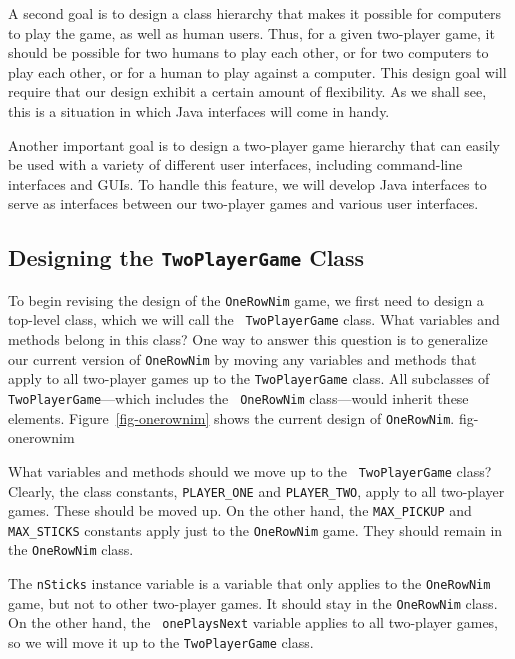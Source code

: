 A second goal is to design a class hierarchy that makes it possible
for computers to play the game, as well as human users. Thus, for a
given two-player game, it should be possible for two humans to play
each other, or for two computers to play each other, or for a human
to play against a computer.  This design goal will require that our
design exhibit a certain amount of flexibility.  As we shall see, this
is a situation in which Java interfaces will come in handy.

Another important goal is to design a two-player game hierarchy that
can easily be used with a variety of different user interfaces,
including command-line interfaces and GUIs.  To handle this feature,
we will develop Java interfaces to serve as interfaces
between our two-player games and various user interfaces.

\subsection{Designing the {\tt TwoPlayerGame} Class}

To begin revising the design of the {\tt OneRowNim} game, we first
need to design a top-level class, which we will call the {\tt
TwoPlayerGame} class.  What variables and methods belong in this
class?  One way to answer this question is to generalize our current
version of {\tt OneRowNim} by moving any variables and methods that
apply to all two-player games up to the {\tt TwoPlayerGame} class.
All subclasses of {\tt TwoPlayerGame}---which includes the {\tt
OneRowNim} class---would inherit these elements.  Figure~\ref{fig-onerownim} shows
the current design of {\tt OneRowNim}.
{fig-onerownim}

What variables and methods should we move up to the {\tt
TwoPlayer\-Game} class?  Clearly, the class constants, {\tt PLAYER\_ONE}
and {\tt PLAYER\_TWO}, apply to all two-player games. These
should be moved up.  On the other hand, the {\tt MAX\_PICKUP} and {\tt
MAX\_STICKS} constants apply just to the {\tt OneRowNim} game. They
should remain in the {\tt OneRowNim} class.

The {\tt nSticks} instance variable is a variable that only applies to
the {\tt OneRowNim} game, but not to other two-player games. It should
stay in the {\tt OneRowNim} class. On the other hand, the {\tt
onePlaysNext} variable applies to all two-player games, so we will
move it up to the {\tt TwoPlayerGame} class.

